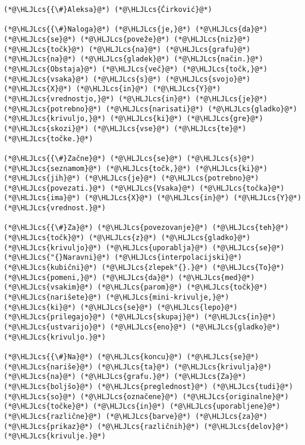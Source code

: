 \documentclass[12pt,a4paper]{article}
\newcommand{\HLJLcs}[1]{\textcolor[RGB]{153,153,119}{\textit{#1}}}
\begin{document}
\begin{lstlisting}
(*@\HLJLcs{{\#}Aleksa}@*) (*@\HLJLcs{Ćirković}@*)

(*@\HLJLcs{{\#}Naloga}@*) (*@\HLJLcs{je,}@*) (*@\HLJLcs{da}@*) (*@\HLJLcs{se}@*) (*@\HLJLcs{poveže}@*) (*@\HLJLcs{niz}@*) (*@\HLJLcs{točk}@*) (*@\HLJLcs{na}@*) (*@\HLJLcs{grafu}@*) (*@\HLJLcs{na}@*) (*@\HLJLcs{gladek}@*) (*@\HLJLcs{način.}@*) (*@\HLJLcs{Obstaja}@*) (*@\HLJLcs{več}@*) (*@\HLJLcs{točk,}@*) (*@\HLJLcs{vsaka}@*) (*@\HLJLcs{s}@*) (*@\HLJLcs{svojo}@*) (*@\HLJLcs{X}@*) (*@\HLJLcs{in}@*) (*@\HLJLcs{Y}@*) (*@\HLJLcs{vrednostjo,}@*) (*@\HLJLcs{in}@*) (*@\HLJLcs{je}@*) (*@\HLJLcs{potrebno}@*) (*@\HLJLcs{narisati}@*) (*@\HLJLcs{gladko}@*) (*@\HLJLcs{krivuljo,}@*) (*@\HLJLcs{ki}@*) (*@\HLJLcs{gre}@*) (*@\HLJLcs{skozi}@*) (*@\HLJLcs{vse}@*) (*@\HLJLcs{te}@*) (*@\HLJLcs{točke.}@*)

(*@\HLJLcs{{\#}Začne}@*) (*@\HLJLcs{se}@*) (*@\HLJLcs{s}@*) (*@\HLJLcs{seznamom}@*) (*@\HLJLcs{točk,}@*) (*@\HLJLcs{ki}@*) (*@\HLJLcs{jih}@*) (*@\HLJLcs{je}@*) (*@\HLJLcs{potrebno}@*) (*@\HLJLcs{povezati.}@*) (*@\HLJLcs{Vsaka}@*) (*@\HLJLcs{točka}@*) (*@\HLJLcs{ima}@*) (*@\HLJLcs{X}@*) (*@\HLJLcs{in}@*) (*@\HLJLcs{Y}@*) (*@\HLJLcs{vrednost.}@*)

(*@\HLJLcs{{\#}Za}@*) (*@\HLJLcs{povezovanje}@*) (*@\HLJLcs{teh}@*) (*@\HLJLcs{točk}@*) (*@\HLJLcs{z}@*) (*@\HLJLcs{gladko}@*) (*@\HLJLcs{krivuljo}@*) (*@\HLJLcs{uporablja}@*) (*@\HLJLcs{se}@*) (*@\HLJLcs{"{}Naravni}@*) (*@\HLJLcs{interpolacijski}@*) (*@\HLJLcs{kubični}@*) (*@\HLJLcs{zlepek"{}.}@*) (*@\HLJLcs{To}@*) (*@\HLJLcs{pomeni,}@*) (*@\HLJLcs{da}@*) (*@\HLJLcs{med}@*) (*@\HLJLcs{vsakim}@*) (*@\HLJLcs{parom}@*) (*@\HLJLcs{točk}@*) (*@\HLJLcs{narišete}@*) (*@\HLJLcs{mini-krivulje,}@*) (*@\HLJLcs{ki}@*) (*@\HLJLcs{se}@*) (*@\HLJLcs{lepo}@*) (*@\HLJLcs{prilegajo}@*) (*@\HLJLcs{skupaj}@*) (*@\HLJLcs{in}@*) (*@\HLJLcs{ustvarijo}@*) (*@\HLJLcs{eno}@*) (*@\HLJLcs{gladko}@*) (*@\HLJLcs{krivuljo.}@*)

(*@\HLJLcs{{\#}Na}@*) (*@\HLJLcs{koncu}@*) (*@\HLJLcs{se}@*) (*@\HLJLcs{nariše}@*) (*@\HLJLcs{ta}@*) (*@\HLJLcs{krivulja}@*) (*@\HLJLcs{na}@*) (*@\HLJLcs{grafu.}@*) (*@\HLJLcs{Za}@*) (*@\HLJLcs{boljšo}@*) (*@\HLJLcs{preglednost}@*) (*@\HLJLcs{tudi}@*) (*@\HLJLcs{so}@*) (*@\HLJLcs{označene}@*) (*@\HLJLcs{originalne}@*) (*@\HLJLcs{točke}@*) (*@\HLJLcs{in}@*) (*@\HLJLcs{uporabljene}@*) (*@\HLJLcs{različne}@*) (*@\HLJLcs{barve}@*) (*@\HLJLcs{za}@*) (*@\HLJLcs{prikaz}@*) (*@\HLJLcs{različnih}@*) (*@\HLJLcs{delov}@*) (*@\HLJLcs{krivulje.}@*)


\end{lstlisting}
\end{document}
